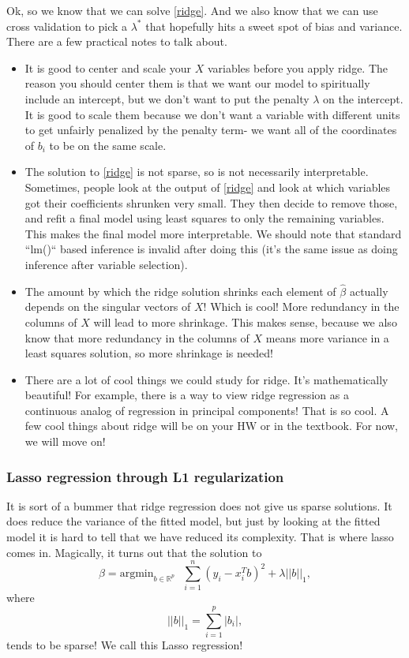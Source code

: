 Ok, so we know that we can solve \eqref{ridge}. And we also know that we can use cross validation to pick a $\lambda^*$ that hopefully hits a sweet spot of bias and variance. There are a few practical notes to talk about.
\begin{itemize}
\item It is good to center and scale your $X$ variables before you apply ridge. The reason you should center them is that we want our model to spiritually include an intercept, but we don't want to put the penalty $\lambda$ on the intercept. It is good to scale them because we don't want a variable with different units to get unfairly penalized by the penalty term- we want all of the coordinates of $b_i$ to be on the same scale. 
\item The solution to \eqref{ridge} is not sparse, so is not necessarily interpretable. Sometimes, people look at the output of \eqref{ridge} and look at which variables got their coefficients shrunken very small. They then decide to remove those, and refit a final model using least squares to only the remaining variables. This makes the final model more interpretable. We should note that standard ``lm()`` based inference is  invalid after doing this (it's the same issue as doing inference after variable selection). 
\item The amount by which the ridge solution shrinks each element of $\hat{\beta}$ actually depends on the singular vectors of $X$! Which is cool! More redundancy in the columns of $X$ will lead to more shrinkage. This makes sense, because we also know that more redundancy in the columns of $X$ means more variance in a least squares solution, so more shrinkage is needed!
\item There are a lot of cool things we could study for ridge. It's mathematically beautiful! For example, there is a way to view ridge regression as a continuous analog of regression in principal components! That is so cool. A few cool things about ridge will be on your HW or in the textbook. For now, we will move on!
\end{itemize}

\subsubsection{Lasso regression through L1 regularization}

It is sort of a bummer that ridge regression does not give us sparse solutions. It does reduce the variance of the fitted model, but just by looking at the fitted model it is hard to tell that we have reduced its complexity. That is where lasso comes in. Magically, it turns out that the solution to
\begin{equation}
\label{lasso}	
\hat{\beta} = \mathrm{argmin}_{b \in \mathbb{R}^p} \ \ \ \sum_{i=1}^n \left( y_i - x_i^T b \right)^2 + \lambda ||b||_1,
\end{equation}
where
$$
||b||_1 = \sum_{i=1}^p | b_i |,
$$
tends to be sparse! We call this Lasso regression! 

